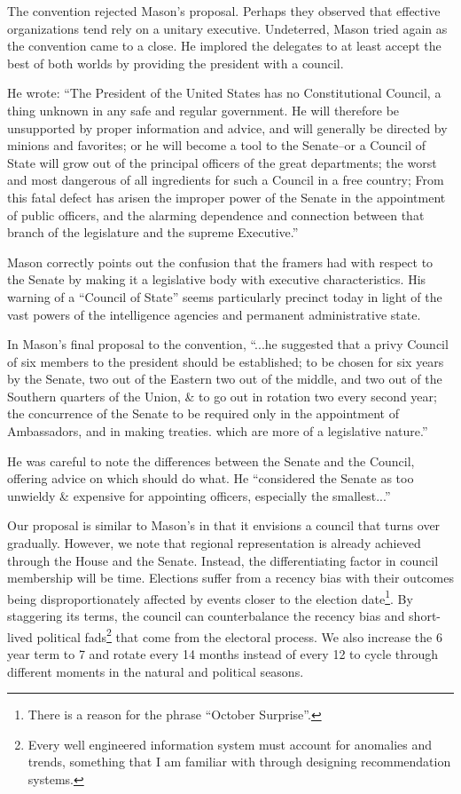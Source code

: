 \documentclass{article}
\newcommand{\quotes}[1]{``#1''}
\begin{document}
The convention rejected Mason's proposal. Perhaps they observed that effective organizations tend rely on a unitary executive. Undeterred, Mason tried again as the convention came to a close. He implored the delegates to at least accept the best of both worlds by providing the president with a council.

He wrote: \quotes{The President of the United States has no Constitutional Council, a thing unknown in any safe and regular government. He will therefore be unsupported by proper information and advice, and will generally be directed by minions and favorites; or he will become a tool to the Senate--or a Council of State will grow out of the principal officers of the great departments; the worst and most dangerous of all ingredients for such a Council in a free country; From this fatal defect has arisen the improper power of the Senate in the appointment of public officers, and the alarming dependence and connection between that branch of the legislature and the supreme Executive.}\cite{Mason_Objection}

Mason correctly points out the confusion that the framers had with respect to the Senate by making it a legislative body with executive characteristics. His warning of a \quotes{Council of State} seems particularly precinct today in light of the vast powers of the intelligence agencies and permanent administrative state.\cite{Cooper}

In Mason's final proposal to the convention, \quotes{...he suggested that a privy Council of six members to the president should be established; to be chosen for six years by the Senate, two out of the Eastern two out of the middle, and two out of the Southern quarters of the Union, \& to go out in rotation two every second year; the concurrence of the Senate to be required only in the appointment of Ambassadors, and in making treaties. which are more of a legislative nature.}\cite{Madison}

He was careful to note the differences between the Senate and the Council, offering advice on which should do what. He \quotes{considered the Senate as too unwieldy \& expensive for appointing officers, especially the smallest...}

Our proposal is similar to Mason's in that it envisions a council that turns over gradually. However, we note that regional representation is already achieved through the House and the Senate. Instead, the differentiating factor in council membership will be time. Elections suffer from a recency bias with their outcomes being disproportionately affected by events closer to the election date\footnote{There is a reason for the phrase \quotes{October Surprise}.}. By staggering its terms, the council can counterbalance the recency bias and short-lived political fads\footnote{Every well engineered information system must account for anomalies and trends, something that I am familiar with through designing recommendation systems.\cite{Yang}} that come from the electoral process. We also increase the 6 year term to 7 and rotate every 14 months instead of every 12 to cycle through different moments in the natural and political seasons.
\end{document}
